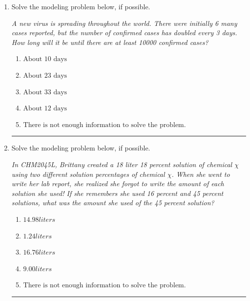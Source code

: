 \documentclass[14pt]{extbook}
\newcommand{\litem}[1]{\item#1\hspace*{-1cm}\rule{\textwidth}{0.4pt}}
\begin{document}
\begin{enumerate}
{\begin{enumerate}[label=\Alph*.]
\end{enumerate} }
\litem{
Solve the modeling problem below, if possible.
\begin{center}
    \textit{ A new virus is spreading throughout the world. There were initially 6 many cases reported, but the number of confirmed cases has doubled every 3 days. How long will it be until there are at least 10000 confirmed cases? }
\end{center}
\begin{enumerate}[label=\Alph*.]
\item \( \text{About } 10 \text{ days} \)
\item \( \text{About } 23 \text{ days} \)
\item \( \text{About } 33 \text{ days} \)
\item \( \text{About } 12 \text{ days} \)
\item \( \text{There is not enough information to solve the problem.} \)

\end{enumerate} }
\litem{
Solve the modeling problem below, if possible.
\begin{center}
    \textit{ In CHM2045L, Brittany created a 18 liter 18 percent solution of chemical $\chi$ using two different solution percentages of chemical $\chi$. When she went to write her lab report, she realized she forgot to write the amount of each solution she used! If she remembers she used 16 percent and 45 percent solutions, what was the amount she used of the 45 percent solution? }
\end{center}
\begin{enumerate}[label=\Alph*.]
\item \( 14.98 liters \)
\item \( 1.24 liters \)
\item \( 16.76 liters \)
\item \( 9.00 liters \)
\item \( \text{There is not enough information to solve the problem.} \)

\end{enumerate} }
\end{enumerate}
\end{document}
